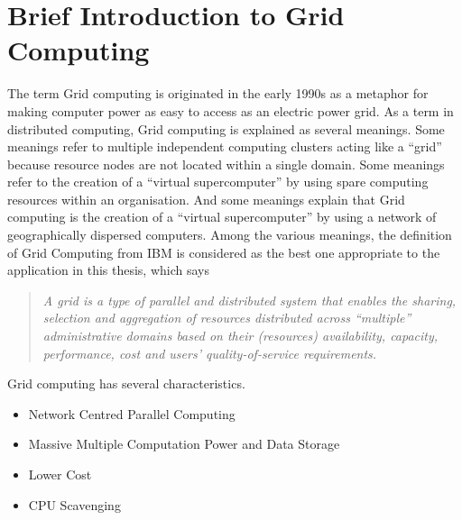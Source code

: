 \section{Brief Introduction to Grid Computing}\label{sec:introGridComputing}
The term Grid computing is originated in the early 1990s as a metaphor for making computer power as easy to access as an electric power grid. As a term in distributed computing, Grid computing is explained as several meanings. Some meanings refer to multiple independent computing clusters acting like a ``grid'' because resource nodes are not located within a single domain. Some meanings refer to the creation of a ``virtual supercomputer'' by using spare computing resources within an organisation. And some meanings explain that Grid computing is the creation of a ``virtual supercomputer'' by using a network of geographically dispersed computers.  Among the various meanings, the definition of Grid Computing from \mbox{IBM} is considered as the best one appropriate to the application in this thesis, which says
\begin{quotation}
\textit{A grid is a type of parallel and distributed system that enables the sharing, selection and aggregation of resources distributed across ``multiple'' administrative domains based on their (resources) availability, capacity, performance, cost and users' quality-of-service requirements.}
\end{quotation} 
Grid computing has several characteristics.
\begin{itemize}
 \item Network Centred Parallel Computing
 \item Massive Multiple Computation Power and Data Storage
 \item Lower Cost
 \item CPU Scavenging
\end{itemize}
